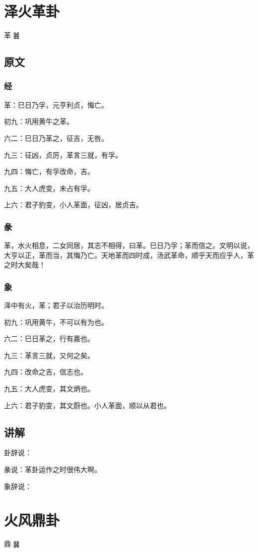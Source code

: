 \documentclass[12pt,oneside]{book}
\begin{document}
\chapter{泽火革卦}
革 {\Large ䷰}

\section{原文}

\subsection{经}
革：巳日乃孚，元亨利贞，悔亡。

初九：巩用黄牛之革。

六二：巳日乃革之，征吉，无咎。

九三：征凶，贞厉，革言三就，有孚。

九四：悔亡，有孚改命，吉。

九五：大人虎变，未占有孚。

上六：君子豹变，小人革面，征凶，居贞吉。

\subsection{彖}
革，水火相息，二女同居，其志不相得，曰革。巳日乃孚；革而信之。文明以说，大亨以正，革而当，其悔乃亡。天地革而四时成，汤武革命，顺乎天而应乎人，革之时大矣哉！

\subsection{象}
泽中有火，革；君子以治历明时。

初九：巩用黄牛，不可以有为也。

六二：巳日革之，行有嘉也。

九三：革言三就，又何之矣。

九四：改命之吉，信志也。

九五：大人虎变，其文炳也。

上六：君子豹变，其文蔚也。小人革面，顺以从君也。

\section{讲解}
卦辞说：

彖说：革卦运作之时很伟大啊。

象辞说：

\chapter{火风鼎卦}
鼎 {\large ䷱}
\end{document}
